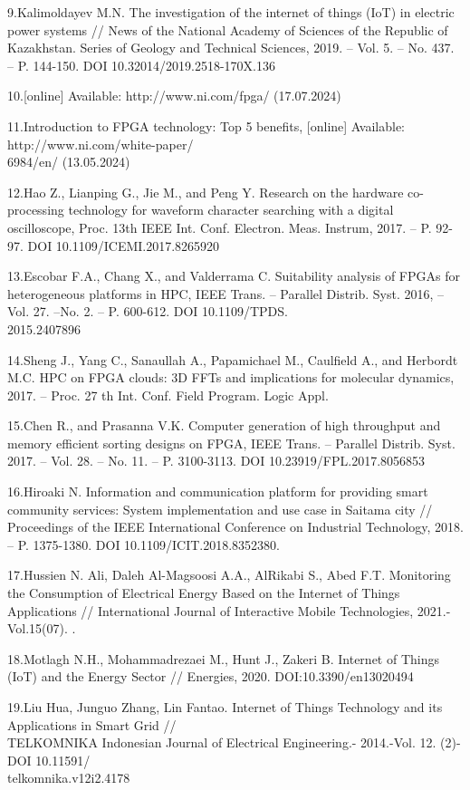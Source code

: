 \begin{noparindent}
9.Kalimoldayev M.N. The investigation of the internet of things (IoT) in
electric power systems // News of the National Academy of Sciences of
the Republic of Kazakhstan. Series of Geology and Technical Sciences,
2019. -- Vol. 5. -- No. 437. -- P. 144-150. DOI
10.32014/2019.2518-170X.136

10.{[}online{]} Available: http://www.ni.com/fpga/ (17.07.2024)

11.Introduction to FPGA technology: Top 5 benefits, {[}online{]}
Available: http://www.ni.com/white-paper/\\6984/en/ (13.05.2024)

12.Hao Z., Lianping G., Jie M., and Peng Y. Research on the hardware
co-processing technology for waveform character searching with a digital
oscilloscope, Proc. 13th IEEE Int. Conf. Electron. Meas. Instrum, 2017.
-- P. 92-97. DOI 10.1109/ICEMI.2017.8265920

13.Escobar F.A., Chang X., and Valderrama C. Suitability analysis of
FPGAs for heterogeneous platforms in HPC, IEEE Trans. -- Parallel
Distrib. Syst. 2016, -- Vol. 27. --No. 2. -- P. 600-612. DOI 10.1109/TPDS.\\2015.2407896

14.Sheng J., Yang C., Sanaullah A., Papamichael M., Caulfield A., and
Herbordt M.C. HPC on FPGA clouds: 3D FFTs and implications for molecular
dynamics, 2017. -- Proc. 27 th Int. Conf. Field Program. Logic Appl.

15.Chen R., and Prasanna V.K. Computer generation of high throughput and
memory efficient sorting designs on FPGA, IEEE Trans. -- Parallel
Distrib. Syst. 2017. -- Vol. 28. -- No. 11. -- P. 3100-3113. DOI
10.23919/FPL.2017.8056853

16.Hiroaki N. Information and communication platform for providing smart
community services: System implementation and use case in Saitama city
// Proceedings of the IEEE International Conference on Industrial
Technology, 2018. -- P. 1375-1380. DOI 10.1109/ICIT.2018.8352380.

17.Hussien N. Ali, Daleh Al-Magsoosi A.A., AlRikabi S., Abed F.T.
Monitoring the Consumption of Electrical Energy Based on the Internet of
Things Applications // International Journal of Interactive Mobile
Technologies, 2021.-Vol.15(07). .

18.Motlagh N.H., Mohammadrezaei M., Hunt J., Zakeri B. Internet of
Things (IoT) and the Energy Sector // Energies, 2020.
DOI:10.3390/en13020494

19.Liu Hua, Junguo Zhang, Lin Fantao. Internet of Things Technology and
its Applications in Smart Grid // \\TELKOMNIKA Indonesian Journal of
Electrical Engineering.- 2014.-Vol. 12. (2)- DOI
10.11591/\\telkomnika.v12i2.4178


\end{noparindent}
